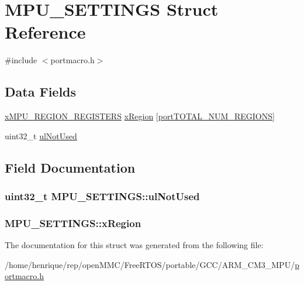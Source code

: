 \hypertarget{structMPU__SETTINGS}{\section{M\-P\-U\-\_\-\-S\-E\-T\-T\-I\-N\-G\-S Struct Reference}
\label{structMPU__SETTINGS}
}


{\ttfamily \#include $<$portmacro.\-h$>$}

\subsection*{Data Fields}
\begin{DoxyCompactItemize}
\item 
\hyperlink{GCC_2ARM__CM3__MPU_2portmacro_8h_a28e2341640d210b3e4893ca3c8f82760}{x\-M\-P\-U\-\_\-\-R\-E\-G\-I\-O\-N\-\_\-\-R\-E\-G\-I\-S\-T\-E\-R\-S} \hyperlink{structMPU__SETTINGS_a2a9a5a281e3dc50a17c883307b7933e7}{x\-Region} \mbox{[}\hyperlink{RVDS_2ARM__CM4__MPU_2portmacro_8h_ae12a3a7fad41e9756e95b6cac92a9af0}{port\-T\-O\-T\-A\-L\-\_\-\-N\-U\-M\-\_\-\-R\-E\-G\-I\-O\-N\-S}\mbox{]}
\item 
uint32\-\_\-t \hyperlink{structMPU__SETTINGS_a9599c07af8be7854df16440f6735456e}{ul\-Not\-Used}
\end{DoxyCompactItemize}


\subsection{Field Documentation}
\hypertarget{structMPU__SETTINGS_a9599c07af8be7854df16440f6735456e}{
\subsubsection[{ul\-Not\-Used}]{\setlength{\rightskip}{0pt plus 5cm}uint32\-\_\-t M\-P\-U\-\_\-\-S\-E\-T\-T\-I\-N\-G\-S\-::ul\-Not\-Used}}\label{structMPU__SETTINGS_a9599c07af8be7854df16440f6735456e}
\hypertarget{structMPU__SETTINGS_a2a9a5a281e3dc50a17c883307b7933e7}{
\subsubsection[{x\-Region}]{ M\-P\-U\-\_\-\-S\-E\-T\-T\-I\-N\-G\-S\-::x\-Region}}\label{structMPU__SETTINGS_a2a9a5a281e3dc50a17c883307b7933e7}


The documentation for this struct was generated from the following file\-:\begin{DoxyCompactItemize}
\item 
/home/henrique/rep/open\-M\-M\-C/\-Free\-R\-T\-O\-S/portable/\-G\-C\-C/\-A\-R\-M\-\_\-\-C\-M3\-\_\-\-M\-P\-U/\hyperlink{GCC_2ARM__CM3__MPU_2portmacro_8h}{portmacro.\-h}\end{DoxyCompactItemize}
